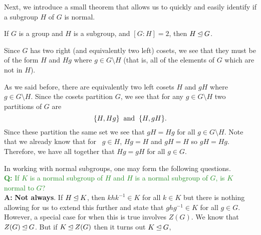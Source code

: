     Next, we introduce a small theorem that allows us to quickly and
    easily identify if a subgroup $H$ of $G$ is normal. 

    \begin{thm}
        If $G$ is a group and $H$ is a subgroup, and $[G:H] = 2$, then
        $H \unlhd G$.
    \end{thm}
    
    \begin{prf}
        Since $G$ has two right (and equivalently two left) cosets, we
        see that they must be of the form $H$ and $Hg$ where $g \in
        G\setminus H$ (that is, all of the elements of $G$ which are
        not in $H$).   

        As we said before, there are equivalently two left cosets $H$
        and $gH$ where $g \in G\setminus H$. Since the cosets partition $G$, we see that for any $g \in
        G\setminus H$ two partitions of $G$ are 
        \[
            \{H, Hg\} \hspace{0.2cm}\text{and}\hspace{0.2cm} \{H, gH\}.
        \]
        Since these partition the same set we see that $gH = Hg$ for
        all $g \in G\setminus H$. Note that we already know that for
        \    $g \in H$, $Hg = H$ and $gH = H$ so $gH = Hg$. Therefore,
        we have all together that $Hg = gH$ for all $g \in G$.
    \end{prf}

    \noindent In working with normal subgroups, one may form the following
    questions. 
    \\
    
    \textcolor{ForestGreen}{\textbf{Q:} If $K$ is a normal subgroup of $H$ and $H$ is a normal
    subgroup of $G$, is $K$ normal to $G$?}
    \\

    \textbf{A:} \textbf{Not always}. If $H \unlhd K$, then $khk^{-1} \in
    K$ for all $k \in K$ but there is nothing allowing for us to extend
    this further and state that $ghg^{-1} \in K$ for all $g \in G$. 
    \\
    However, a special case for when this is true involves $Z(G)$. We
    know that $Z(G) \unlhd G$. But if $K \unlhd Z(G)$ then
    it turns out $K \unlhd G$, 







    \newpage

